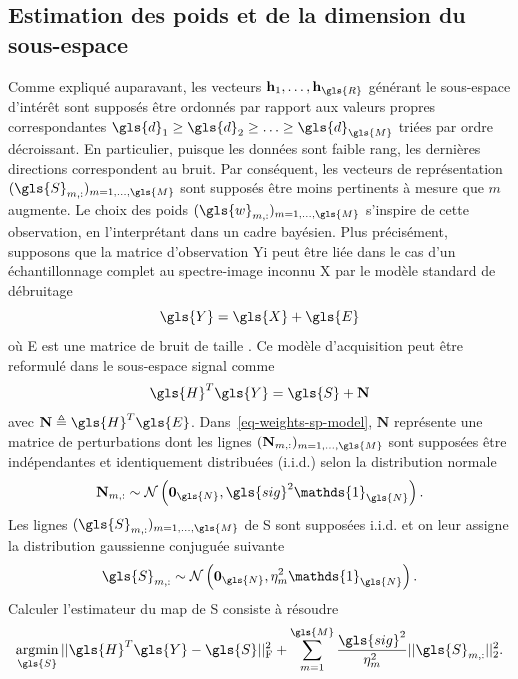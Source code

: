 \subsection{Estimation des poids et de la dimension du sous-espace}\label{subsec-3s-poids}

Comme expliqué auparavant, les vecteurs $\mathbf{h}_1,\ldots,\mathbf{h}_{\gls{R}}$ générant le sous-espace d'intérêt sont supposés être ordonnés par rapport aux valeurs propres correspondantes $\gls{d}_1\geq\gls{d}_2\geq \ldots\geq \gls{d}_{\gls{M}}$ triées par ordre décroissant. En particulier, puisque les données sont faible rang, les dernières directions correspondent au bruit. Par conséquent, les vecteurs de représentation $(\gls{S}_{m, :})_{m=1,\dots,\gls{M}}$ sont supposés être moins pertinents à mesure que $m$ augmente. Le choix des poids $(\gls{w}_{m, :})_{m=1,\dots,\gls{M}}$ s'inspire de cette observation, en l'interprétant dans un cadre bayésien.
%
Plus précisément, supposons que la matrice d'observation \gls{Yi} peut être liée dans le cas d'un échantillonnage complet au spectre-image inconnu \gls{X} par le modèle standard de débruitage
\begin{equation}
    \gls{Y} = \gls{X} + \gls{E}
\end{equation}
où \gls{E} est une matrice de bruit de taille . Ce modèle d'acquisition peut être reformulé dans le sous-espace signal comme
\begin{equation}\label{eq-weights-sp-model}
    \gls{H}^T\gls{Y} = \gls{S} + \mathbf{N}
\end{equation}
avec $\mathbf{N} \triangleq \gls{H}^T\gls{E}$. Dans~\eqref{eq-weights-sp-model}, $\mathbf{N}$ représente une matrice de perturbations dont les lignes $(\mathbf{N}_{m, :})_{m=1,\dots,\gls{M}}$ sont supposées être indépendantes et identiquement distribuées (i.i.d.) selon la distribution normale
\begin{equation}
    \mathbf{N}_{m, :} \sim \mathcal{N}\left(\boldsymbol{0}_{\gls{N}},\gls{sig}^2 \mathds{1}_{\gls{N}}\right).
\end{equation}
Les lignes $(\gls{S}_{m, :})_{m=1,\dots,\gls{M}}$ de \gls{S} sont supposées i.i.d. et on leur assigne la distribution gaussienne conjuguée suivante
\begin{equation}
    \gls{S}_{m,:} \sim \mathcal{N}\left(\boldsymbol{0}_{\gls{N}},\eta^2_{m} \mathds{1}_{\gls{N}}\right).
\end{equation}
Calculer l'estimateur du \gls{map} de \gls{S} consiste à résoudre
\begin{equation}
\argmin_{\gls{S}} \frobnorm{\gls{H}^T\gls{Y}-\gls{S}} + \sum_{m = 1}^{\gls{M}} \frac{\gls{sig}^2}{\eta^2_m}\twonorm{\gls{S}_{m,:}}.
\label{eq-3S_OP_2_Bayesian}
\end{equation}
